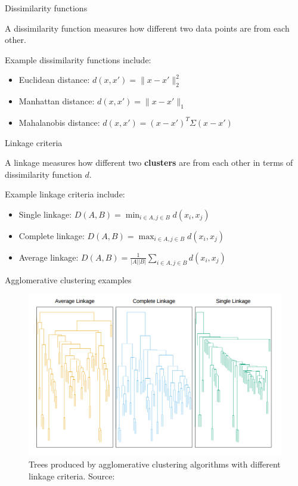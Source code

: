 \documentclass[10pt, compress]{beamer}
\begin{document}
\begin{frame}{Dissimilarity functions}

  A dissimilarity function measures how
  different two data points are from each other.

  Example dissimilarity functions include:
  \begin{itemize}
    \item Euclidean distance: $d(x, x') = \|x - x'\|_2^2$
    \item Manhattan distance: $d(x, x') = \|x - x'\|_1$
    \item Mahalanobis distance: $d(x, x') = (x - x')^T\Sigma(x - x')$
  \end{itemize}
\end{frame}

\begin{frame}{Linkage criteria}

  A linkage measures how
  different two \textbf{clusters} are from each other
  in terms of dissimilarity function $d$.

  Example linkage criteria include:
  \begin{itemize}
    \item<2-> Single linkage: $D(A, B) = \min_{i \in A, j\in B} d(x_i, x_j)$
    \item<3-> Complete linkage: $D(A, B) = \max_{i \in A, j\in B} d(x_i, x_j)$
    \item<4-> Average linkage: $D(A, B) = \frac{1}{|A||B|}\sum_{i \in A, j\in B} d(x_i, x_j)$
  \end{itemize}
\end{frame}

\begin{frame}{Agglomerative clustering examples}
  \begin{figure}
    \includegraphics[width=\textwidth]{img/dendrograms}
    \caption{Trees produced by agglomerative clustering algorithms
    with different linkage criteria. Source: \citep{Hastie2009}}
    \label{fig:dendrograms}
  \end{figure}
\end{frame}
\end{document}

